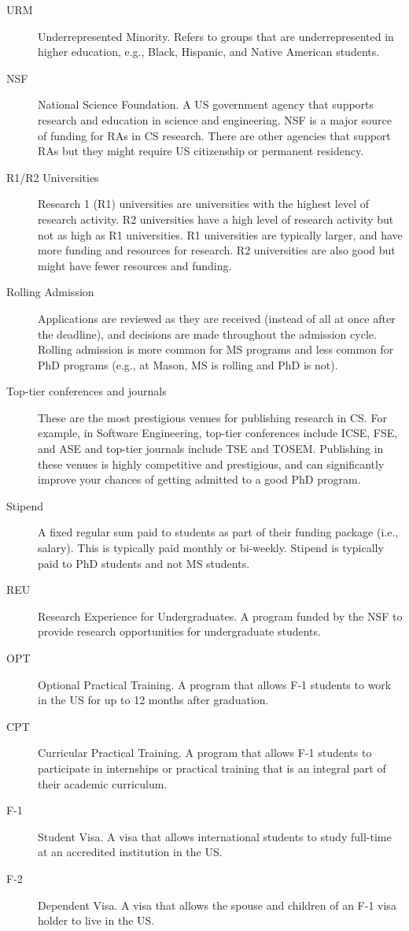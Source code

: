 \documentclass[oneside,11pt,dvipsnames]{book}
\begin{document}
\begin{description}
  \item[URM] Underrepresented Minority. Refers to groups that are underrepresented in higher education, e.g., Black, Hispanic, and Native American students.
  \item[NSF] National Science Foundation. A US government agency that supports research and education in science and engineering. NSF is a major source of funding for RAs in CS research. There are other agencies that support RAs but they might require US citizenship or permanent residency.
    
  \item [R1/R2 Universities] Research 1 (R1) universities are universities with the highest level of research activity. R2 universities have a high level of research activity but not as high as R1 universities.  R1 universities are typically larger, and have more funding and resources for research.  R2 universities are also good but might have fewer resources and funding.
  
    \item [Rolling Admission] Applications are reviewed as they are received (instead of all at once after the deadline), and decisions are made throughout the admission cycle.  Rolling admission is more common for MS programs and less common for PhD programs (e.g., at Mason, MS is rolling and PhD is not).

  \item [Top-tier conferences and journals] These are the most prestigious venues for publishing research in CS.  For example, in Software Engineering, top-tier conferences include ICSE, FSE, and ASE and top-tier journals include TSE and TOSEM.  Publishing in these venues is highly competitive and prestigious, and can significantly improve your chances of getting admitted to a good PhD program.

        \item [Stipend] A fixed regular sum paid to students as part of their funding package (i.e., salary). This is typically paid monthly or bi-weekly.  Stipend is typically paid to PhD students and not MS students.
  \item[REU] Research Experience for Undergraduates. A program funded by the NSF to provide research opportunities for undergraduate students.
    \item[OPT] Optional Practical Training. A program that allows F-1 students to work in the US for up to 12 months after graduation.
  \item[CPT] Curricular Practical Training. A program that allows F-1 students to participate in internships or practical training that is an integral part of their academic curriculum.
  \item[F-1] Student Visa. A visa that allows international students to study full-time at an accredited institution in the US.
  \item[F-2] Dependent Visa. A visa that allows the spouse and children of an F-1 visa holder to live in the US.
\end{description}
\end{document}
